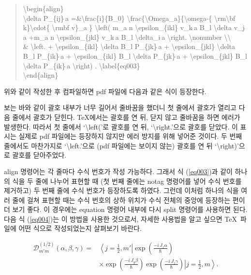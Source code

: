 \documentclass{gshs-report-v1.2}
\begin{document}
\begin{quote}
	{\textbackslash}begin\{align\}\\
	{\textbackslash}delta P\_\{ij\}$\hat{\ }$a 
	=\&{\textbackslash}frac\{i\}\{B\_0\} 
	{\textbackslash}frac\{{\textbackslash}Omega\_a\}\{{\textbackslash}omega-\{
	{\textbackslash}rm{\textbackslash}bf k\}{\textbackslash}cdot\{ 
	{\textbackslash}rm\linebreak{\textbackslash}bf v\}\_a \} 
	{\textbackslash}left( m\_a n {\textbackslash}epsilon\_\{ikl\} 
	v\_k$\hat{\ }$a B\_l {\textbackslash}delta v\_j$\hat{\ }$a +m\_a n 
	{\textbackslash}epsilon\_\{jkl\} v\_k$\hat{\ }$a B\_l 
	{\textbackslash}delta\_i$\hat{\ }$a {\textbackslash}right. 
	{\textbackslash}nonumber {\textbackslash}{\textbackslash} \\
	\& {\textbackslash}left. + {\textbackslash}epsilon\_\{ikl\} {\textbackslash}delta B\_l P\_\{jk\}$\hat{\ }$a + {\textbackslash}epsilon\_\{jkl\} {\textbackslash}delta B\_l P\_\{ik\}$\hat{\ }$a + {\textbackslash}epsilon\_\{ikl\} B\_l {\textbackslash}delta P\_\{jk\}$\hat{\ }$a + {\textbackslash}epsilon\_\{jkl\} B\_l {\textbackslash}delta P\_\{ik\}$\hat{\ }$a {\textbackslash}right) . {\textbackslash}label\{eq003\} \\
	{\textbackslash}end\{align\}
\end{quote}
위와 같이 작성한 후 컴파일하면 pdf 파일에 다음과 같은 식이 등장한다.

보는 바와 같이 괄호 내부가 너무 길어서 줄바꿈을 했더니 첫 줄에서 괄호가 열리고 다음 줄에서 괄호가 닫힌다. \TeX 에서는 괄호를 연 뒤, 닫지 않고 줄바꿈을 하면 에러가 발생한다. 따라서 첫 줄에서 `{\textbackslash}left('로 괄호를 연 뒤, `{\textbackslash}right.'으로 괄호를 닫았다. 이 표시는 실제로 pdf 파일에는 등장하지 않지만 에러 방지를 위해 넣어준 것이다. 두 번째 줄에서도 마찬가지로 `{\textbackslash}left.'으로 (pdf 파일에는 보이지 않는) 괄호를 연 뒤 `{\textbackslash}right)'으로 괄호를 닫아주었다.


align 명령어는 각 줄마다 수식 번호가 작성 가능하다. 그래서 식 (\ref{eq003})과 같이 하나의 식을 두 줄에 나누어 표현할 때 (첫 번째 줄에는 notag 명령어를 넣어 수식 번호를 제거하고) 두 번째 줄에 수식 번호가 등장하도록 하였다. 그런데 이처럼 하나의 식을 여러 줄에 걸쳐 표현할 때는 수식 번호의 상하 위치가 수식 전체의 중앙에 등장하는 편이 더 보기 좋다. 이 경우에는 equation 명령어 내부에 다시 split 명령어를 사용하면 된다. 다음 식 (\ref{eq004})는 이 방법을 사용한 것으로서, 자세한 사용법을 알고 싶으면 \TeX\ 파일에 어떤 식으로 작성되었는지 살펴보기 바란다.

\begin{equation}
	\begin{split}
		\mathcal{D}_{m'm}^{(1/2)} (\alpha,\beta,\gamma)=&\left\langle j=\frac{1}{2},m'\right|\exp\left(\frac{-i\,J_z \alpha}{\hbar}\right)\\
		&\times\exp\left(\frac{-i\,J_y \beta}{\hbar}\right)\exp\left(\frac{-i\,J_z \gamma}{\hbar}\right)\left| j=\frac{1}{2},m\right\rangle.
	\end{split}
\end{equation}
\end{document}
